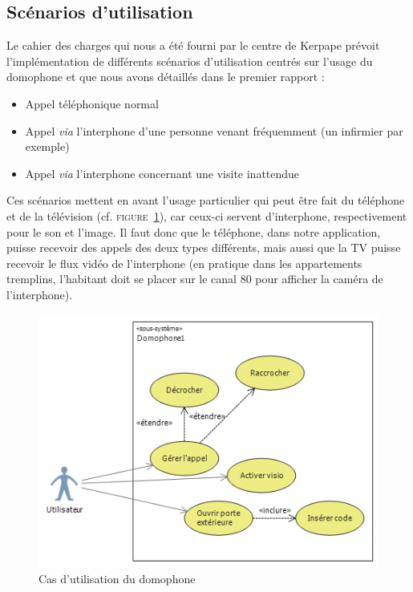 \subsection{Scénarios d'utilisation}
Le cahier des charges qui nous a été fourni par le centre de Kerpape prévoit l'implémentation de différents scénarios d'utilisation centrés sur l'usage du domophone et que nous avons détaillés dans le premier rapport :
\begin{itemize}\renewcommand{\labelitemi}{$\bullet$}
\item Appel téléphonique normal
\item Appel \textit{via} l'interphone d'une personne venant fréquemment (un infirmier par exemple)
\item Appel \textit{via} l'interphone concernant une visite inattendue
\end{itemize}
Ces scénarios mettent en avant l'usage particulier qui peut être fait du téléphone et de la télévision (cf. \textsc{figure~\ref{domophone}}), car ceux-ci servent d'interphone, respectivement pour le son et l'image. Il faut donc que le téléphone, dans notre application, puisse recevoir des appels des deux types différents, mais aussi que la TV puisse recevoir le flux vidéo de l'interphone (en pratique dans les appartements tremplins, l'habitant doit se placer sur le canal 80 pour afficher la caméra de l'interphone).
\begin{figure}[h!]
	\begin{center}
  		\caption{Cas d'utilisation du domophone}
  		\label{domophone}
  		\includegraphics[width=\textwidth]{2-Specifications/img-utilisateur/use_case_diag.PNG}
  	\end{center}
\end{figure}

